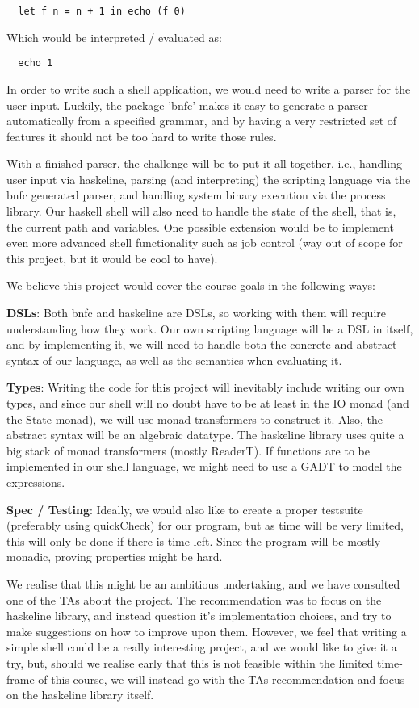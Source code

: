\documentclass[11pt,a4paper]{article}
\begin{document}
\begin{verbatim}
  let f n = n + 1 in echo (f 0)
\end{verbatim}

Which would be interpreted / evaluated as:

\begin{verbatim}
  echo 1
\end{verbatim}

In order to write such a shell application, we would need to write a parser for
the user input. Luckily, the package 'bnfc' makes it easy to generate a parser
automatically from a specified grammar, and by having a very restricted set of
features it should not be too hard to write those rules.

With a finished parser, the challenge will be to put it all together, i.e.,
handling user input via haskeline, parsing (and interpreting) the scripting
language via the bnfc generated parser, and handling system binary execution via
the process library. Our haskell shell will also need to handle the state of the
shell, that is, the current path and variables. One possible extension would be
to implement even more advanced shell functionality such as job control (way out
of scope for this project, but it would be cool to have).


We believe this project would cover the course goals in the following ways:

\textbf{DSLs}: Both bnfc and haskeline are DSLs, so working with them will require
understanding how they work. Our own scripting language will be a DSL in itself,
and by implementing it, we will need to handle both the concrete and abstract
syntax of our language, as well as the semantics when evaluating it.

\textbf{Types}: Writing the code for this project will inevitably include writing our own
types, and since our shell will no doubt have to be at least in the IO monad
(and the State monad), we will use monad transformers to construct it. Also, the
abstract syntax will be an algebraic datatype.  The haskeline library uses quite
a big stack of monad transformers (mostly ReaderT). If functions are to be
implemented in our shell language, we might need to use a GADT to model the
expressions.

\textbf{Spec / Testing}: Ideally, we would also like to create  a proper testsuite
(preferably using quickCheck) for our program, but as time will be very limited,
this will only be done if there is time left. Since the program will be mostly
monadic, proving properties might be hard.

We realise that this might be an ambitious undertaking, and we have consulted
one of the TAs about the project. The recommendation was to focus on the
haskeline library, and instead question it’s implementation choices, and try to
make suggestions on how to improve upon them. However, we feel that writing a
simple shell could be a really interesting project, and we would like to give it
a try, but, should we realise early that this is not feasible within the limited
time-frame of this course, we will instead go with the TAs recommendation and
focus on the haskeline library itself.
\end{document}
